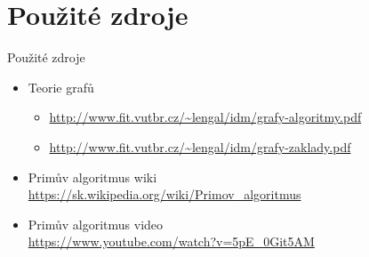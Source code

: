 \documentclass[10pt, hyperref={unicode}]{beamer}[3.5.2020]
\begin{document}
\section{Použité zdroje}

\begin{frame}{Použité zdroje}
    \begin{itemize}
        \item Teorie grafů 
        \begin{itemize}
            \item \url{http://www.fit.vutbr.cz/~lengal/idm/grafy-algoritmy.pdf} 
            \item \url{http://www.fit.vutbr.cz/~lengal/idm/grafy-zaklady.pdf}
        \end{itemize}
        \item Primův algoritmus wiki \\ \url{https://sk.wikipedia.org/wiki/Primov_algoritmus}
        \item Primův algoritmus video \\ \url{https://www.youtube.com/watch?v=5pE_0Git5AM}
    \end{itemize}
\end{frame}
\end{document}

